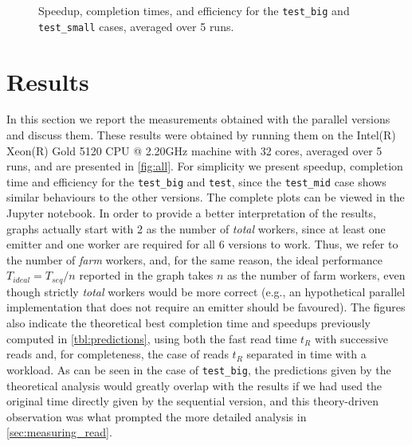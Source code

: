 \documentclass{article}
\begin{document}
\newpage
{}
\begin{figure}[H]\centering
\subfigure{}
\subfigure{}
\subfigure{}
\subfigure{}
\subfigure{}
\subfigure{}
\caption{Speedup, completion times, and efficiency for the \texttt{test\_big} and \texttt{test\_small} cases, averaged over 5 runs.}
\label{fig:all}
\end{figure}
\restoregeometry
\newpage

\titlespacing{\paragraph}{0em}{0.3em}{0.3em}

\section{Results}\label{sec:results}
In this section we report the measurements obtained with the parallel versions and discuss them. These results were obtained by running them on the Intel(R) Xeon(R) Gold 5120 CPU @ 2.20GHz machine with 32 cores, averaged over 5 runs, and are presented in \autoref{fig:all}. For simplicity we present speedup, completion time and efficiency for the \texttt{test\_big} and \texttt{test\small}, since the \texttt{test\_mid} case shows similar behaviours to the other versions. The complete plots can be viewed in the Jupyter notebook. In order to provide a better interpretation of the results, graphs actually start with 2 as the number of \emph{total} workers, since at least one emitter and one worker are required for all 6 versions to work. Thus, we refer to the number of \emph{farm} workers, and, for the same reason, the ideal performance $T_{ideal} = T_{seq} / n$ reported in the graph takes $n$ as the number of farm workers, even though strictly \emph{total} workers would be more correct (e.g., an hypothetical parallel implementation that does not require an emitter should be favoured). The figures also indicate the theoretical best completion time and speedups previously computed in \autoref{tbl:predictions}, using both the fast read time $t_R$ with successive reads and, for completeness, the case of reads $t_R$ separated in time with a workload. As can be seen in the case of \texttt{test\_big}, the predictions given by the theoretical analysis would greatly overlap with the results if we had used the original time directly given by the sequential version, and this theory-driven observation was what prompted the more detailed analysis in \autoref{sec:measuring_read}.
\end{document}
